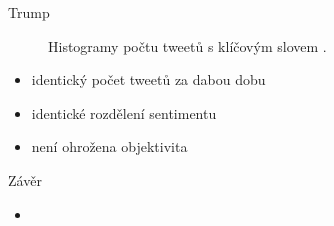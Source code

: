 \documentclass[notheorems,12pt]{beamer}
\begin{document}
\begin{frame}{Trump}
    \begin{figure}
        \centering
        \vspace{-0.7cm}
        \caption*{Histogramy počtu tweetů s klíčovým slovem \textit{}.}
    \end{figure}
	\begin{itemize}
		\item identický počet tweetů za dabou dobu
        \item identické rozdělení sentimentu
        \item není ohrožena objektivita
	\end{itemize}
\end{frame}
\begin{frame}{Závěr}
	\begin{itemize}
		\item 
	\end{itemize}
\end{frame}
\end{document}

